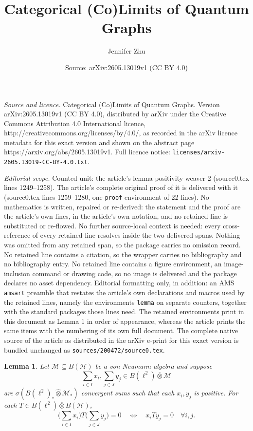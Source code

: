 \documentclass[10pt,a4paper]{amsart}
\title{Categorical (Co)Limits of Quantum Graphs}
\author{Jennifer Zhu}
\date{Source: arXiv:2605.13019v1 (CC BY 4.0)}
\newtheorem{lemma}{Lemma}
\renewcommand{\bar}[1]{\overline{#1}}
\renewcommand{\hat}[1]{\widehat{#1}}
\newcommand{\mc}[1]{\mathcal{#1}}
\renewcommand{\subset}{\subseteq}
\begin{document}
\maketitle

\noindent\emph{Source and licence.} Categorical (Co)Limits of Quantum Graphs. Version arXiv:2605.13019v1 (CC BY 4.0), distributed by arXiv under the Creative Commons Attribution 4.0 International licence, http://creativecommons.org/licenses/by/4.0/, as recorded in the arXiv licence metadata for this exact version and shown on the abstract page https://arxiv.org/abs/2605.13019v1. Full licence notice: \texttt{licenses/arxiv-2605.13019-CC-BY-4.0.txt}.\par\smallskip

\noindent\textit{Editorial scope.} Counted unit: the article's lemma positivity-weaver-2 (source0.tex lines 1249--1258). The article's complete original proof of it is delivered with it (source0.tex lines 1259--1280, one \texttt{proof} environment of 22 lines). No mathematics is written, repaired or re-derived: the statement and the proof are the article's own lines, in the article's own notation, and no retained line is substituted or re-flowed.  No further source-local context is needed: every cross-reference of every retained line resolves inside the two delivered spans.  Nothing was omitted from any retained span, so the package carries no omission record.  No retained line contains a citation, so the wrapper carries no bibliography and no bibliography entry.  No retained line contains a figure environment, an image-inclusion command or drawing code, so no image is delivered and the package declares no asset dependency.  Editorial formatting only, in addition: an AMS \texttt{amsart} preamble that restates the article's own declarations and macros used by the retained lines, namely the environments \texttt{lemma} on separate counters, together with the standard packages those lines need.  The retained environments print in this document as Lemma 1 in order of appearance, whereas the article prints the same items with the numbering of its own full document.  The complete native source of the article as distributed in the arXiv e-print for this exact version is bundled unchanged as \texttt{sources/200472/source0.tex}.
\begin{lemma} \label{lem: positivity-weaver-2}
    Let $\mc M \subset B(\mc H)$ be a von Neumann algebra and suppose
        \[
        \sum_{i\in I} x_i, \sum_{j \in J} y_j \in B(\ell^2) \bar{\otimes} \mc M
        \]
        are $\sigma(B(\ell^2)_* \hat \otimes \mc M_*)$ convergent sums such that each $x_i, y_j$ is positive. For each $T \in B(\ell^2) \overline{\otimes} B(\mc H)$,
        \[
        \bigg(\sum_{i\in I} x_i\bigg) T \bigg(\sum_{j \in J} y_j\bigg) = 0 \quad \iff \quad x_i T y_j = 0 \quad  \forall i,j.
        \]
\end{lemma}
\end{document}
